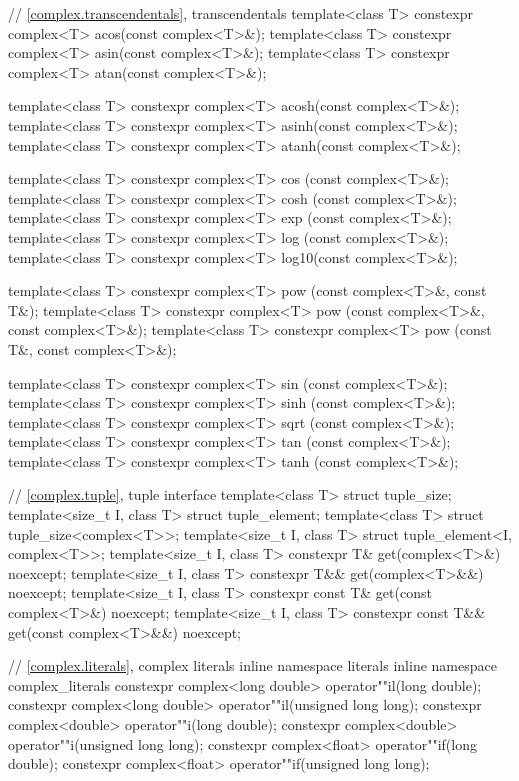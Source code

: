 \begin{codeblock}
{  // \ref{complex.transcendentals}, transcendentals
  template<class T> constexpr complex<T> acos(const complex<T>&);
  template<class T> constexpr complex<T> asin(const complex<T>&);
  template<class T> constexpr complex<T> atan(const complex<T>&);

  template<class T> constexpr complex<T> acosh(const complex<T>&);
  template<class T> constexpr complex<T> asinh(const complex<T>&);
  template<class T> constexpr complex<T> atanh(const complex<T>&);

  template<class T> constexpr complex<T> cos  (const complex<T>&);
  template<class T> constexpr complex<T> cosh (const complex<T>&);
  template<class T> constexpr complex<T> exp  (const complex<T>&);
  template<class T> constexpr complex<T> log  (const complex<T>&);
  template<class T> constexpr complex<T> log10(const complex<T>&);

  template<class T> constexpr complex<T> pow  (const complex<T>&, const T&);
  template<class T> constexpr complex<T> pow  (const complex<T>&, const complex<T>&);
  template<class T> constexpr complex<T> pow  (const T&, const complex<T>&);

  template<class T> constexpr complex<T> sin  (const complex<T>&);
  template<class T> constexpr complex<T> sinh (const complex<T>&);
  template<class T> constexpr complex<T> sqrt (const complex<T>&);
  template<class T> constexpr complex<T> tan  (const complex<T>&);
  template<class T> constexpr complex<T> tanh (const complex<T>&);

  // \ref{complex.tuple}, tuple interface
  template<class T> struct tuple_size;
  template<size_t I, class T> struct tuple_element;
  template<class T> struct tuple_size<complex<T>>;
  template<size_t I, class T> struct tuple_element<I, complex<T>>;
  template<size_t I, class T>
    constexpr T& get(complex<T>&) noexcept;
  template<size_t I, class T>
    constexpr T&& get(complex<T>&&) noexcept;
  template<size_t I, class T>
    constexpr const T& get(const complex<T>&) noexcept;
  template<size_t I, class T>
    constexpr const T&& get(const complex<T>&&) noexcept;

  // \ref{complex.literals}, complex literals
  inline namespace literals {
  inline namespace complex_literals {
    constexpr complex<long double> operator""il(long double);
    constexpr complex<long double> operator""il(unsigned long long);
    constexpr complex<double> operator""i(long double);
    constexpr complex<double> operator""i(unsigned long long);
    constexpr complex<float> operator""if(long double);
    constexpr complex<float> operator""if(unsigned long long);
  }
  }
}
\end{codeblock}

